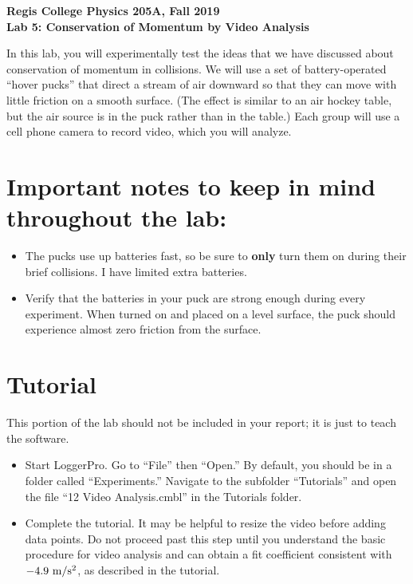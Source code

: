 \documentclass[10pt]{article}
\begin{document}
\begin{center}\vspace{-15ex}
{\bf{Regis College Physics 205A, Fall 2019}} \\
{\bf{Lab 5: Conservation of Momentum by Video Analysis}} \\
\end{center}

In this lab, you will experimentally test the ideas that we have discussed
about conservation of momentum in collisions. We will use a set of battery-operated ``hover pucks'' that direct a stream 
of air downward
so that they can move with little friction on a smooth surface.  (The effect
is similar to an air hockey table, but the air source is in the puck
rather than in the table.)  Each group will use a cell phone camera to record video, which you will analyze.

\section*{Important notes to keep in mind throughout the lab:}

\begin{itemize}
\item The pucks use up batteries fast, so be sure to \textbf{only} turn them on during their brief collisions. I have limited extra batteries.
\item Verify that the batteries in your puck are strong enough during every experiment. When turned on and placed on a level surface, the puck should experience almost zero friction from the surface.
\end{itemize}

\section{Tutorial}
This portion of the lab should not be included in your report; it is just to teach the software.
\begin{itemize}
\item Start LoggerPro. Go to ``File'' then ``Open.'' By default, you should be in a folder called ``Experiments.'' Navigate to the subfolder ``Tutorials'' and open  the 
file ``12 Video Analysis.cmbl'' in the Tutorials folder.
\item Complete the tutorial. It may be helpful to resize the video before adding data points. Do not proceed past this step until you understand the basic procedure for video analysis and can obtain a fit coefficient consistent with $-4.9~\rm m/s^2$, as described in the tutorial. 

\end{itemize}
\end{document}
